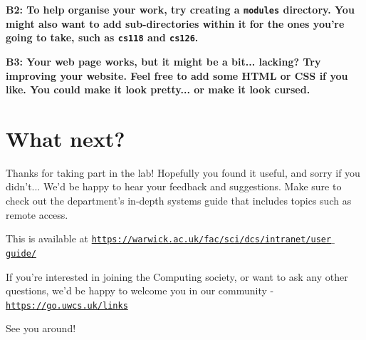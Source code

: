 \documentclass[a4paper,11pt,parskip=half-]{scrartcl}
\begin{document}
\bfseries B2: \normalfont 
To help organise your work, try creating a \texttt{modules} directory. 
You might also want to add sub-directories within it for the ones you're going to take, such as \texttt{cs118} and \texttt{cs126}.

\bfseries B3: \normalfont 
Your web page works, but it might be a bit... lacking? 
Try improving your website. 
Feel free to add some HTML or CSS if you like. 
You could make it look pretty... or make it look cursed.

\section*{What next?}

Thanks for taking part in the lab! Hopefully you found it useful, and sorry if you didn't... 
We'd be happy to hear your feedback and suggestions.
Make sure to check out the department's in-depth systems guide that includes topics such as remote access.

This is available at \href{https://warwick.ac.uk/fac/sci/dcs/intranet/user_guide/}{\texttt{https://warwick.ac.uk/fac/sci/dcs/intranet/user$\_$guide/}}

If you're interested in joining the Computing society, or want to ask any other questions, we'd be happy to welcome you in our community - \href{https://go.uwcs.uk/links}{\texttt{https://go.uwcs.uk/links}}

See you around!
\end{document}
